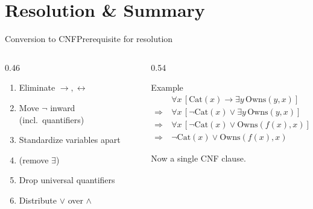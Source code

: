 \documentclass[aspectratio=169,11pt]{beamer}
\begin{document}
\section{Resolution \& Summary}

\begin{frame}{Conversion to CNF}{Prerequisite for resolution}
  \begin{columns}[T]
    \begin{column}{0.46\textwidth}
      \begin{enumerate}\small
        \item Eliminate $\rightarrow,\leftrightarrow$
        \item Move $\neg$ inward (incl.\ quantifiers)
        \item Standardize variables apart
        \item {} (remove $\exists$)
        \item Drop universal quantifiers
        \item Distribute $\lor$ over $\land$
      \end{enumerate}
    \end{column}
    \begin{column}{0.54\textwidth}
      \begin{exampleblock}{Example}
        \scriptsize
        \begin{align*}
          &\forall x\,[\mathrm{Cat}(x) \rightarrow \exists y\,\mathrm{Owns}(y,x)] \\
          \Rightarrow\ &\forall x\,[\neg\mathrm{Cat}(x) \lor \exists y\,\mathrm{Owns}(y,x)] \\
          \Rightarrow\ &\forall x\,[\neg\mathrm{Cat}(x) \lor \mathrm{Owns}(f(x),x)] \\
          \Rightarrow\ &\neg\mathrm{Cat}(x) \lor \mathrm{Owns}(f(x),x)
        \end{align*}
      \end{exampleblock}
      \centering\scriptsize Now a single CNF clause.
    \end{column}
  \end{columns}
\end{frame}
\end{document}
